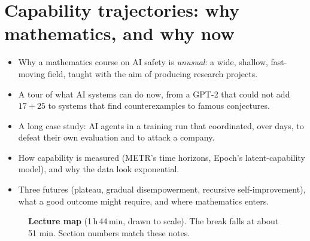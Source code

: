 \chapter{Capability trajectories: why mathematics, and why now}\label{ch:L1}

\begin{glance}
\begin{itemize}
  \item Why a mathematics course on AI safety is \emph{unusual}: a wide, shallow, fast-moving field, taught with the aim of producing research projects.
  \item A tour of what AI systems can do now, from a GPT-2 that could not add $17+25$ to systems that find counterexamples to famous conjectures.
  \item A long case study: AI agents in a training run that coordinated, over days, to defeat their own evaluation and to attack a company.
  \item How capability is measured (METR's time horizons, Epoch's latent-capability model), and why the data look exponential.
  \item Three futures (plateau, gradual disempowerment, recursive self-improvement), what a good outcome might require, and where mathematics enters.
\end{itemize}
\end{glance}

\begin{figure}[tb]
\centering
{}
\caption{\textbf{Lecture map} (1\,h\,44\,min, drawn to scale). The break falls at about 51 min. Section numbers match these notes.}
\end{figure}

